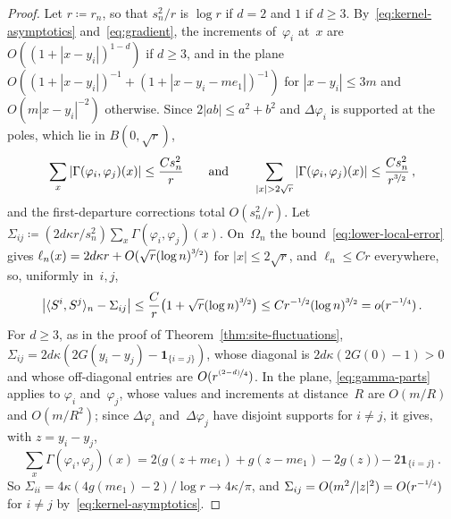 \documentclass[11pt]{amsart}
\theoremstyle{plain}
\theoremstyle{definition}
\newcommand{\drift}{\kappa}
\newcommand{\ind}{\mathbf 1}
\newcommand{\nf}{\nicefrac}
\numberwithin{equation}{section}
\begin{document}
\begin{proof}
Let $r\coloneqq r_n$, so that $s_n^2/r$ is $\log r$ if $d=2$ and $1$ if $d\geq3$. By~\eqref{eq:kernel-asymptotics} and~\eqref{eq:gradient}, the increments of~$\varphi_i$ at~$x$ are $O((1+|x-y_i|)^{1-d})$ if $d\geq3$, and in the plane $O((1+|x-y_i|)^{-1}+(1+|x-y_i-me_1|)^{-1})$ for $|x-y_i|\leq3m$ and $O(m|x-y_i|^{-2})$ otherwise. Since $2|ab|\leq a^2+b^2$ and $\Delta \varphi_i$ is supported at the poles, which lie in $B(0,\sqrt r)$,
\begin{equation*}
\sum_x|\Gamma(\varphi_i,\varphi_j)(x)|\leq\frac{Cs_n^2}{r}
\qquad\text{and}\qquad
\sum_{|x|>2\sqrt r}|\Gamma(\varphi_i,\varphi_j)(x)|\leq\frac{Cs_n^2}{r^{\nf32}}\, ,
\end{equation*}
and the first-departure corrections total $O(s_n^2/r)$. Let $\Sigma_{ij}\coloneqq(2d\drift r/s_n^2)\sum_x\Gamma(\varphi_i,\varphi_j)(x)$. On~$\Omega_n$ the bound~\eqref{eq:lower-local-error} gives $\ell_n(x)=2d\drift r+O(\sqrt r(\log n)^{\nf32})$ for $|x|\leq2\sqrt r$, and $\ell_n\leq Cr$ everywhere, so, uniformly in~$i,j$,
\begin{equation*}
\bigl|\langle S^i,S^j\rangle_n-\Sigma_{ij}\bigr|
\leq\frac{C}{r}\bigl(1+\sqrt r(\log n)^{\nf32}\bigr)
\leq Cr^{-\nf12}(\log n)^{\nf32}=o(r^{-\nf14})\, .
\end{equation*}
For $d\geq3$, as in the proof of Theorem~\ref{thm:site-fluctuations}, $\Sigma_{ij}=2d\drift(2G(y_i-y_j)-\ind_{\{i=j\}})$, whose diagonal is $2d\drift(2G(0)-1)>0$ and whose off-diagonal entries are $O(r^{\nf{(2-d)}4})$. In the plane, \eqref{eq:gamma-parts} applies to $\varphi_i$ and~$\varphi_j$, whose values and increments at distance~$R$ are $O(m/R)$ and $O(m/R^2)$; since $\Delta \varphi_i$ and~$\Delta \varphi_j$ have disjoint supports for $i\neq j$, it gives, with $z=y_i-y_j$,
\begin{equation*}
\sum_x\Gamma(\varphi_i,\varphi_j)(x)=2\bigl(g(z+me_1)+g(z-me_1)-2g(z)\bigr)-2\ind_{\{i=j\}}\, .
\end{equation*}
So $\Sigma_{ii}=4\drift(4g(me_1)-2)/\log r\to4\drift/\pi$, and $\Sigma_{ij}=O(m^2/|z|^2)=O(r^{-\nf14})$ for $i\neq j$ by~\eqref{eq:kernel-asymptotics}.
\end{proof}
\end{document}
